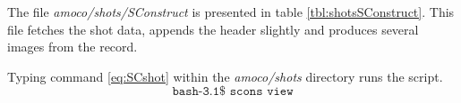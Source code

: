 The file \emph{amoco/shots/SConstruct} is presented in table \ref{tbl:shotsSConstruct}.  This file fetches the shot data, appends the header slightly and produces several images from the record.

{
\tiny

\normalsize
}

Typing command \ref{eq:SCshot} within the \emph{amoco\slash shots} directory runs the script.
\begin{equation}\label{eq:SCshot} \texttt{bash-3.1\$\ scons\ view} \end{equation}


